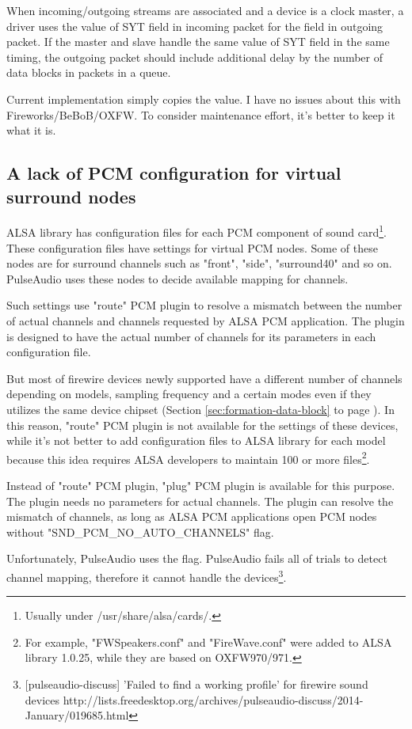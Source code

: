 \documentclass[onecolumn]{article}
\begin{document}
When incoming/outgoing streams are associated and a device is a clock master, a driver uses the value of SYT field in incoming packet for the field in outgoing packet. If the master and slave handle the same value of SYT field in the same timing, the outgoing packet should include additional delay by the number of data blocks in packets in a queue. 

Current implementation simply copies the value. I have no issues about this with Fireworks/BeBoB/OXFW. To consider maintenance effort, it's better to keep it what it is.

\subsection{A lack of PCM configuration for virtual surround nodes}

ALSA library has configuration files for each PCM component of sound card\footnote{Usually under /usr/share/alsa/cards/.}. These configuration files have settings for virtual PCM nodes. Some of these nodes are for surround channels such as "front", "side", "surround40" and so on. PulseAudio uses these nodes to decide available mapping for channels.

Such settings use "route" PCM plugin to resolve a mismatch between the number of actual channels and channels requested by ALSA PCM application. The plugin is designed to have the actual number of channels for its parameters in each configuration file.

But most of firewire devices newly supported have a different number of channels depending on models, sampling frequency and a certain modes even if they utilizes the same device chipset (Section \ref{sec:formation-data-block} to page \pageref{sec:formation-data-block}). In this reason, "route" PCM plugin is not available for the settings of these devices, while it's not better to add configuration files to ALSA library for each model because this idea requires ALSA developers to maintain 100 or more files\footnote{For example, "FWSpeakers.conf" and "FireWave.conf" were added to ALSA library 1.0.25, while they are based on OXFW970/971.}.

Instead of "route" PCM plugin, "plug" PCM plugin is available for this purpose. The plugin needs no parameters for actual channels. The plugin can resolve the mismatch of channels, as long as ALSA PCM applications open PCM nodes without "SND\_PCM\_NO\_AUTO\_CHANNELS" flag.

Unfortunately, PulseAudio uses the flag. PulseAudio fails all of trials to detect channel mapping, therefore it cannot handle the devices\footnote{[pulseaudio-discuss] 'Failed to find a working profile' for firewire sound devices http://lists.freedesktop.org/archives/pulseaudio-discuss/2014-January/019685.html}.
\end{document}
